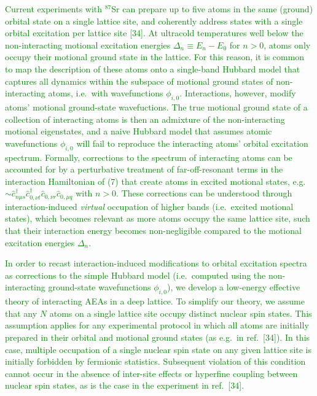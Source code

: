 \documentclass[preprint,showkeys,nofootinbib]{revtex4-1}
\renewcommand{\c}{\hat{c}}
\newcommand{\1}{\mathds{1}}
\newcommand{\green}[1]{\textcolor{green}{#1}}
\newcounter{point}
\begin{document}
\begin{enumerate}[label=(R1.\arabic{point}.\arabic*)]
  \green{Current experiments with ${}^{87}$Sr can prepare up to five
    atoms in the same (ground) orbital state on a single lattice site,
    and coherently address states with a single orbital excitation per
    lattice site [34].  At ultracold temperatures well below the
    non-interacting motional excitation energies
    $\Delta_n\equiv E_n-E_0$ for $n>0$, atoms only occupy their
    motional ground state in the lattice.  For this reason, it is
    common to map the description of these atoms onto a single-band
    Hubbard model that captures all dynamics within the subspace of
    motional ground states of non-interacting atoms, i.e.~with
    wavefunctions $\phi_{i,0}$.  Interactions, however, modify atoms'
    motional ground-state wavefuctions.  The true motional ground
    state of a collection of interacting atoms is then an admixture of
    the non-interacting motional eigenstates, and a naive Hubbard
    model that assumes atomic wavefunctions $\phi_{i,0}$ will fail to
    reproduce the interacting atoms' orbital excitation spectrum.
    Formally, corrections to the spectrum of interacting atoms can be
    accounted for by a perturbative treatment of far-off-resonant
    terms in the interaction Hamiltonian of (7) that create atoms in
    excited motional states,
    e.g.~$\sim\c_{n\mu s}^\dag \c_{0,\nu t}^\dag \c_{0,\nu r}
    \c_{0,\mu q}$ with $n>0$.  These corrections can be understood
    through interaction-induced {\it virtual} occupation of higher
    bands (i.e.~excited motional states), which becomes relevant as
    more atoms occupy the same lattice site, such that their
    interaction energy becomes non-negligible compared to the motional
    excitation energies $\Delta_n$.}

  \green{In order to recast interaction-induced modifications to
    orbital excitation spectra as corrections to the simple Hubbard
    model (i.e.~computed using the non-interacting ground-state
    wavefunctions $\phi_{i,0}$), we develop a low-energy effective
    theory of interacting AEAs in a deep lattice.  To simplify our
    theory, we assume that any $N$ atoms on a single lattice site
    occupy distinct nuclear spin states.  This assumption applies for
    any experimental protocol in which all atoms are initially
    prepared in their orbital and motional ground states (as e.g.~in
    ref.~[34]).  In this case, multiple occupation of a single nuclear
    spin state on any given lattice site is initially forbidden by
    fermionic statistics.  Subsequent violation of this condition
    cannot occur in the absence of inter-site effects or hyperfine
    coupling between nuclear spin states, as is the case in the
    experiment in ref.~[34].}



\end{enumerate}
\end{document}
